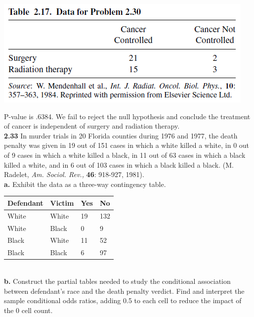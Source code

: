 \documentclass[paper=letter, fontsize=11pt]{scrartcl} %
\begin{document}
\begin{center}
	\includegraphics[scale=.75]{table217.png}
\end{center}

P-value is .6384. We fail to reject the null hypothesis and conclude the treatment of cancer
is independent of surgery and radiation therapy. \\

\textbf{2.33} In murder trials in 20 Florida counties during 1976 and 1977, the death penalty was given in 19 out of 151 cases in which a white killed a white, in 0 out of 9 cases in 
which a white killed a black, in 11 out of 63 cases in which a black killed a white, and 
in 6 out of 103 cases in which a black killed a black. (M. Radelet, \textit{Am. Sociol. 
Rev.,} \textbf{46}: 918-927, 1981). \\

\textbf{a.} Exhibit the data as a three-way contingency table. \\

\begin{tabular}{|l|l|l|l|}
\hline
Defendant & Victim & Yes & No  \\ \hline
White     & White  & 19  & 132 \\ \hline
White     & Black  & 0   & 9   \\ \hline
Black     & White  & 11  & 52  \\ \hline
Black     & Black  & 6   & 97  \\ \hline
\end{tabular}
\\

\textbf{b.} Construct the partial tables needed to study the conditional association 
between defendant's race and the death penalty verdict. Find and interpret the sample
conditional odds ratios, adding 0.5 to each cell to reduce the impact of the 0 cell count.
\\
\end{document}
